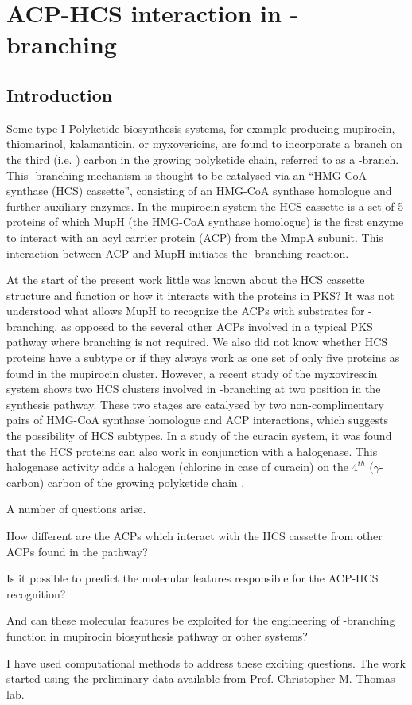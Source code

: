 \chapter{ACP-HCS interaction in \bet-branching}
\label{cha:ACP-HCS}

\section{Introduction}
\label{sec:IntroACP-HCS}
Some type I Polyketide biosynthesis systems, for example producing mupirocin, thiomarinol, kalamanticin, or myxovericins, are found to incorporate a branch on the third (i.e. \bet) carbon in the growing polyketide chain, referred to as a \bet-branch. This \bet-branching mechanism is thought to be catalysed via an \textquotedblleft HMG-CoA synthase (HCS) cassette\textquotedblright, consisting of an HMG-CoA synthase homologue and further auxiliary enzymes. In the mupirocin system the HCS cassette is a set of 5 proteins of which MupH (the HMG-CoA synthase homologue) is the first enzyme to interact with an acyl carrier protein (ACP) from the MmpA subunit. This interaction between ACP and MupH initiates the \bet-branching reaction. 

At the start of the present work little was known about the HCS cassette structure and function or how it interacts with the proteins in PKS? It was not understood what allows MupH to recognize the ACPs with substrates for \bet-branching, as opposed to the several other ACPs involved in a typical PKS pathway where branching is not required. We also did not know whether HCS proteins have a subtype or if they always work as one set of only five proteins as found in the mupirocin cluster. However, a recent study of the myxovirescin system \parencite{Simunovic2006} shows two HCS clusters involved in \bet-branching at two position in the synthesis pathway. These two stages are catalysed by two non-complimentary pairs of HMG-CoA synthase homologue and ACP interactions, which suggests the possibility of HCS subtypes. In a study of the curacin system, it was found that the HCS proteins can also work in conjunction with a halogenase. This halogenase activity adds a halogen (chlorine in case of curacin) on the $4^{th}$ ($ \gamma $-carbon) carbon of the growing polyketide chain \parencite{Busche2012}. 

A number of questions arise.
\begin{inparaenum}[\itshape 1\upshape)]
\item How different are the ACPs which interact with the HCS cassette from other ACPs found in the pathway? 
\item Is it possible to predict the molecular features responsible for the ACP-HCS recognition? 
\item And can these molecular features be exploited for the engineering of \bet-branching function in mupirocin biosynthesis pathway or other systems?
\end{inparaenum}
I have used computational methods to address these exciting questions. The work started using the preliminary data available from Prof. Christopher M. Thomas lab. 

